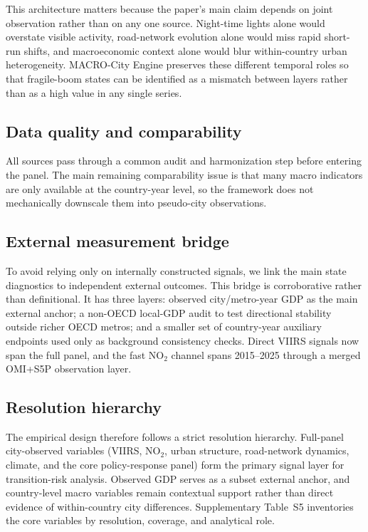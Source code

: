 \documentclass[oneside,pdflatex,sn-nature]{sn-jnl}
\begin{document}
This architecture matters because the paper's main claim depends on joint observation rather than on any one source. Night-time lights alone would overstate visible activity, road-network evolution alone would miss rapid short-run shifts, and macroeconomic context alone would blur within-country urban heterogeneity. MACRO-City Engine preserves these different temporal roles so that fragile-boom states can be identified as a mismatch between layers rather than as a high value in any single series.

\subsection{Data quality and comparability}
All sources pass through a common audit and harmonization step before entering the panel. The main remaining comparability issue is that many macro indicators are only available at the country-year level, so the framework does not mechanically downscale them into pseudo-city observations.

\subsection{External measurement bridge}
To avoid relying only on internally constructed signals, we link the main state diagnostics to independent external outcomes. This bridge is corroborative rather than definitional. It has three layers: observed city/metro-year GDP as the main external anchor; a non-OECD local-GDP audit to test directional stability outside richer OECD metros; and a smaller set of country-year auxiliary endpoints used only as background consistency checks. Direct VIIRS signals now span the full panel, and the fast NO$_2$ channel spans 2015--2025 through a merged OMI+S5P observation layer.

\subsection{Resolution hierarchy}
The empirical design therefore follows a strict resolution hierarchy. Full-panel city-observed variables (VIIRS, NO$_2$, urban structure, road-network dynamics, climate, and the core policy-response panel) form the primary signal layer for transition-risk analysis. Observed GDP serves as a subset external anchor, and country-level macro variables remain contextual support rather than direct evidence of within-country city differences. Supplementary Table~S5 inventories the core variables by resolution, coverage, and analytical role.
\end{document}
